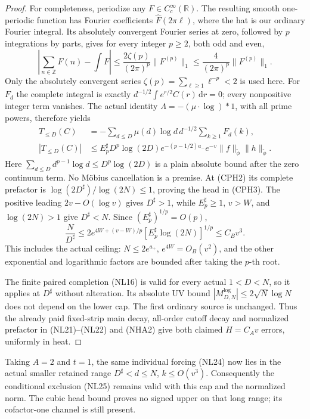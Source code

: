 \documentclass[11pt]{article}
\theoremstyle{remark}\newtheorem{remark}[theorem]{Remark}
\newcommand{\R}{\mathbb R}
\newcommand{\Z}{\mathbb Z}
\newcommand{\dd}{\,\mathrm d}
\begin{document}
\begin{proof}
For completeness, periodize any \(F\in C_c^\infty(\R)\).
The resulting smooth one-periodic function has Fourier coefficients
\(\widehat F(2\pi\ell)\), where the hat is our ordinary
Fourier integral. Its absolutely convergent Fourier series at zero,
followed by \(p\) integrations by parts, gives for every integer
\(p\ge2\), both odd and even,
\[
 \left|\sum_{n\in\Z}F(n)-\int F\right|
 \le\frac{2\zeta(p)}{(2\pi)^p}\|F^{(p)}\|_1
 \le\frac4{(2\pi)^p}\|F^{(p)}\|_1 .                          \tag{CPH7}
\]
Only the absolutely convergent series
\(\zeta(p)=\sum_{\ell\ge1}\ell^{-p}<2\) is used here.
For \(F_d\) the complete integral is exactly
\(d^{-1/2}\int e^{r/2}C(r)\dd r=0\); every nonpositive
integer term vanishes. The actual identity
\(\Lambda=-(\mu\cdot\log)*1\), with all prime powers, therefore yields
\[
 \begin{split}
 T_{\le D}(C)
 &=-\sum_{d\le D}\mu(d)\log d\,d^{-1/2}
                         \sum_{k\ge1}F_d(k),\\
 |T_{\le D}(C)|
 &\le E_p^\sharp D^p\log(2D)e^{-(p-1/2)a_-}e^{-v}
                         \|f\|_{\widetilde\phi}\|h\|_{\widetilde\phi}.
 \end{split}                                                   \tag{CPH8}
\]
Here \(\sum_{d\le D}d^{p-1}\log d\le D^p\log(2D)\)
is a plain absolute bound after the zero continuum term.
No M\"obius cancellation is a premise.
At (CPH2) its complete prefactor is
\(\log(2D^\sharp)/\log(2N)\le1\), proving the head in (CPH3).
The positive leading \(2v-O(\log v)\) gives \(D^\sharp>1\),
while \(E_p^\sharp\ge1\), \(v>W\), and \(\log(2N)>1\)
give \(D^\sharp<N\).
Since \((E_p^\sharp)^{1/p}=O(p)\),
\[
 \frac{N}{D^\sharp}
 \le2e^{4W+(v-W)/p}[E_p^\sharp\log(2N)]^{1/p}
 \le C_Bv^3.                                                 \tag{CPH9}
\]
This includes the actual ceiling: \(N\le2e^{a_+}\),
\(e^{4W}=O_B(v^2)\), and the other exponential and logarithmic
factors are bounded after taking the \(p\)-th root.

The finite paired completion (NL16) is valid for every actual
\(1<D<N\), so it applies at \(D^\sharp\) without alteration.
Its absolute UV bound \(|M^{\log}_{D,N}|\le2\sqrt N\log N\)
does not depend on the lower cap. The first ordinary source is
unchanged. Thus the already paid fixed-strip main decay,
all-order cutoff decay and normalized prefactor in (NL21)--(NL22)
and (NHA2) give both claimed \(H=C_Av\) errors, uniformly in heat.
\end{proof}

Taking \(A=2\) and \(t=1\), the same individual forcing (NL24)
now lies in the actual smaller retained range
\(D^\sharp<d\le N\), \(k\le O(v^3)\).
Consequently the conditional exclusion (NL25) remains valid
with this cap and the normalized norm.
The cubic head bound proves no signed upper on that long range;
its cofactor-one channel is still present.
\end{document}
